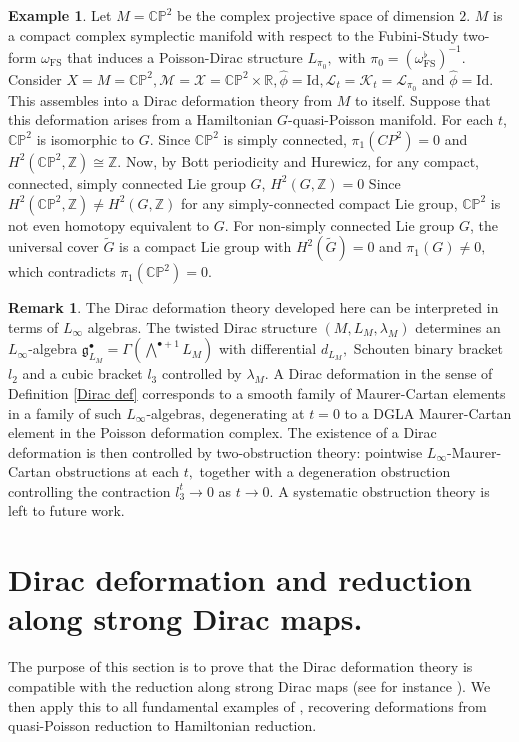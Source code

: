 \documentclass[reqno]{amsart}
\theoremstyle{plain}
\theoremstyle{definition}
\newtheorem{Rem}[Thm]{Remark}
\newtheorem{Exp}[Thm]{Example}
\newcommand{\R}{\mathbb{R}}
\newcommand{\g}{\mathfrak{g}}
\newcommand{\too}{\longrightarrow}
\newcommand{\M}{\mathcal{M}}
\renewcommand{\L}{\mathcal{L}}
\newcommand{\X}{\mathcal{X}}
\newcommand{\K}{\mathcal{K}}
\begin{document}
\begin{Exp} \label{ex:CP2}  
Let $M = \mathbb{CP}^{2}$ be the complex projective space of dimension $2$. $M$ is a compact complex symplectic manifold with respect to the Fubini-Study two-form $\omega_{\text{FS}}$ that induces a Poisson-Dirac structure $L_{\pi_0},$ with $\pi_0 = (\omega_{\text{FS}}^{\flat})^{-1}.$ Consider $ X = M = \mathbb{CP}^{2}, \M = \X = \mathbb{CP}^{2} \times \R, \widehat{\phi} = \mathrm{Id}, \L_t = \K_t = \L_{\pi_{0}}$ and $\widehat{\phi} = \mathrm{Id}.$ This assembles into a Dirac deformation theory from $M$ to itself. Suppose that this deformation arises from a Hamiltonian $G$-quasi-Poisson manifold. For each $t$, $\mathbb{CP}^{2}$ is isomorphic to $G$. Since $\mathbb{CP}^{2}$ is simply connected, $\pi_{1}(CP^{2}) = 0$ and $H^{2}(\mathbb{CP}^{2},\mathbb{Z}) \cong \mathbb{Z}.$ Now, by Bott periodicity and Hurewicz, for any compact, connected, simply connected Lie group $G$, $H^{2}(G,\mathbb{Z}) = 0$ Since $H^{2}(\mathbb{CP}^{2},\mathbb{Z}) \neq H^{2}(G,\mathbb{Z})$ for any simply-connected compact Lie group, $\mathbb{CP}^2$ is not even homotopy equivalent to $G$. For non-simply connected Lie group $G$, the universal cover $\tilde{G}$ is a compact Lie group with $H^{2}(\tilde{G}) = 0$ and $\pi_1(G) \neq 0,$ which contradicts $\pi_{1}(\mathbb{CP}^2) = 0.$ 
\end{Exp}

\begin{Rem}
 The Dirac deformation theory developed here can be interpreted in terms of $L_{\infty}$ algebras. The twisted Dirac structure $(M,L_M,\lambda_M)$ determines an $L_{\infty}$-algebra $\g^{\bullet}_{L_M} = \Gamma(\bigwedge^{\bullet + 1}L_M)$ with differential $d_{L_M},$ Schouten binary bracket $l_2$ and a cubic bracket $l_3$ controlled by $\lambda_M.$ A Dirac deformation in the sense of Definition \ref{Dirac def} corresponds to a smooth family of Maurer-Cartan elements in a family of such $L_{\infty}$-algebras, degenerating at $t = 0$ to a DGLA Maurer-Cartan element in the Poisson deformation complex. The existence of a Dirac deformation is then controlled by two-obstruction theory: pointwise $L_{\infty}$-Maurer-Cartan obstructions at each $t,$ together with a degeneration obstruction controlling the contraction $l^{t}_3 \too 0$ as $t \too 0.$ A systematic obstruction theory is left to future work. 
\end{Rem}

\section{Dirac deformation and reduction along strong Dirac maps.} \label{section 4}
The purpose of this section is to prove that the Dirac deformation theory is compatible with the reduction along strong Dirac maps (see for instance \cite{bualibanu2026reduction}). We then apply this to all fundamental examples of \cite{bualibanu2026reduction}, recovering deformations from quasi-Poisson reduction to Hamiltonian reduction. 
\end{document}
